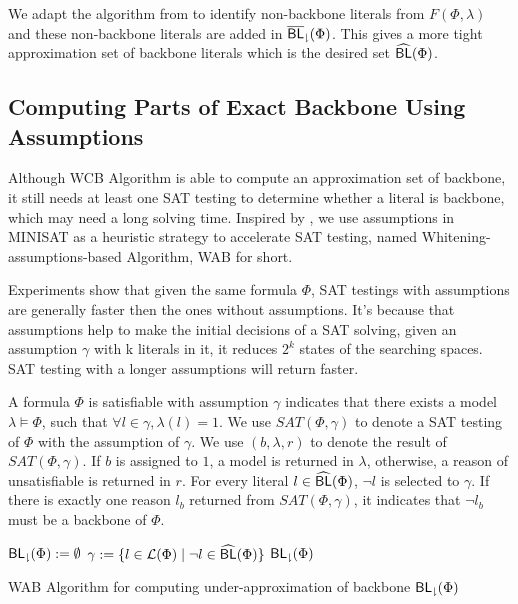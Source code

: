 We adapt the algorithm from \cite{Jon75} to identify non-backbone literals from $F(\Phi,\lambda)$ and these non-backbone literals are added in ${\sf \overline{BL}_\downharpoonright}(\Phi)$.
This gives a more tight approximation set of backbone literals which is the desired set ${\sf \widehat{BL}}(\Phi)$.
\fi

\subsection{Computing Parts of Exact Backbone Using Assumptions}

Although WCB Algorithm is able to compute an approximation set of backbone, it still needs at least one SAT testing to determine whether a literal is backbone, which may need a long solving time. Inspired by \cite{JLM15}, we use assumptions in MINISAT as a heuristic strategy to accelerate SAT testing, named Whitening-assumptions-based Algorithm, WAB for short. 

Experiments show that given the same formula $\Phi$, SAT testings with assumptions are generally faster then the ones without assumptions. It's because that assumptions help to make the initial decisions of a SAT solving, given an assumption $\gamma$ with k literals in it, it reduces $2^k$ states of the searching spaces. SAT testing with a longer assumptions will return faster.

A formula $\Phi$ is satisfiable with assumption $\gamma$ indicates that there exists a model $\lambda\models\Phi$, such that $\forall l\in\gamma, \lambda(l)=1$. We use $SAT(\Phi,\gamma)$ to denote a SAT testing of $\Phi$ with the assumption of $\gamma$. We use $(b, \lambda, r)$ to denote the result of $SAT(\Phi,\gamma)$. If $b$ is assigned to $1$, a model is returned in $\lambda$, otherwise, a reason of unsatisfiable is returned in $r$. For every literal $l\in{\sf \widehat{BL}}(\Phi)$, $\neg l$ is selected to $\gamma$.
If there is exactly one reason $l_b$ returned from $SAT(\Phi,\gamma)$, it indicates that $\neg l_b$ must be a backbone of $\Phi$.


\begin{algorithm2e}
\SetAlgoShortEnd
\SetFillComment
{}
${\sf {BL}_\downharpoonright}(\Phi):=\emptyset$\;
$\gamma:=\{l\in\Lit(\Phi) \mid \neg l\in\BLap(\Phi)\}$\; \label{alg4:init}
\Return ${\sf {BL}_\downharpoonright}(\Phi)$\;
\caption{WAB Algorithm for computing under-approximation of backbone ${\sf {BL}_\downharpoonright}(\Phi)$}
\label{alg:assum}
\end{algorithm2e}

